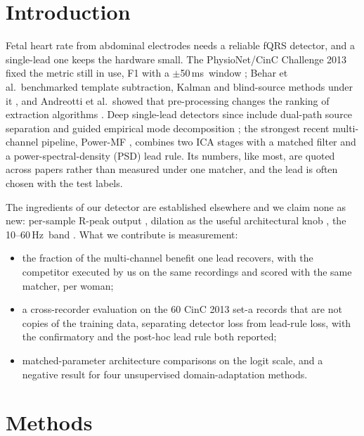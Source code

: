 \documentclass[10pt,twocolumn,a4paper]{article}
\newcommand{\ms}{\,ms}
\newcommand{\Hz}{\,Hz}
\begin{document}
\section{Introduction}
Fetal heart rate from abdominal electrodes needs a reliable fQRS detector, and a single-lead one
keeps the hardware small. The PhysioNet/CinC Challenge 2013 fixed the metric still in use, F1 with a
$\pm$50\ms\ window \cite{silva2013,clifford2014}; Behar et al.\ benchmarked template subtraction,
Kalman and blind-source methods under it \cite{behar2014}, and Andreotti et al.\ showed that
pre-processing changes the ranking of extraction algorithms \cite{andreotti2016}. Deep single-lead
detectors since \cite{zhong2018} include dual-path source separation \cite{shokouhmand2023} and
guided empirical mode decomposition \cite{xu2026}; the strongest recent multi-channel pipeline,
Power-MF \cite{jaeger2024}, combines two ICA stages with a matched filter and a power-spectral-density
(PSD) lead rule. Its numbers, like most, are quoted across papers rather than measured under one
matcher, and the lead is often chosen with the test labels.

The ingredients of our detector are established elsewhere and we claim none as new: per-sample
R-peak output \cite{zahid2022}, dilation as the useful architectural knob \cite{fotiadou2021}, the
10--60\Hz\ band \cite{xu2026}. What we contribute is measurement:
\begin{itemize}\setlength{\itemsep}{0pt}
\item the fraction of the multi-channel benefit one lead recovers, with the competitor executed by
  us on the same recordings and scored with the same matcher, per woman;
\item a cross-recorder evaluation on the 60 CinC 2013 set-a records that are not copies of the
  training data, separating detector loss from lead-rule loss, with the confirmatory and the post-hoc
  lead rule both reported;
\item matched-parameter architecture comparisons on the logit scale, and a negative result for
  four unsupervised domain-adaptation methods.
\end{itemize}

\section{Methods}
\end{document}
